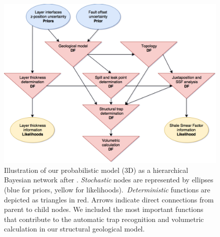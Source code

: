 		\begin{figure}[h]
			\centering
			\includegraphics[width=1\textwidth]{Figures/model_network}
			\caption{Illustration of our probabilistic model (3D) as a hierarchical Bayesian network after \citet{koller2009probabilistic}. \textit{Stochastic} nodes are represented by ellipses (blue for priors, yellow for likelihoods).\ \textit{Deterministic} functions are depicted as triangles in red. Arrows indicate direct connections from parent to child nodes. We included the most important functions that contribute to the automatic trap recognition and volumetric calculation in our structural geological model.}\label{fig:model_network}
		\end{figure} 
		
		
